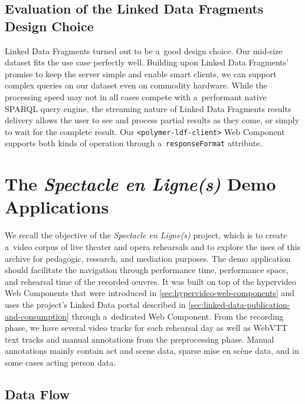 \documentclass[runningheads,a4paper]{llncs}
\begin{document}
\subsection{Evaluation of the Linked Data Fragments Design Choice}

Linked Data Fragments turned out to be a~good design choice.
Our mid-size dataset fits the use case perfectly well.
Building upon Linked Data Fragments' promise to keep the server simple
and enable smart clients, we can support complex queries on our dataset
even on commodity hardware.
While the processing speed may not in all cases compete with a~performant
native SPARQL query engine, the streaming nature of Linked Data Fragments
results delivery allows the user to see and process partial results as they come,
or simply to wait for the complete result.
Our \texttt{<polymer-ldf-client>} Web Component supports both kinds of operation
through a~\texttt{responseFormat} attribute.

\section{The \emph{Spectacle en Ligne(s)} Demo Applications}

We recall the objective of the \emph{Spectacle en Ligne(s)} project,
which  is to create a~video corpus of live theater and opera rehearsals
and to explore the uses of this archive for pedagogic, research, and mediation purposes.
The demo application should facilitate the navigation through performance time,
performance space, and rehearsal time of the recorded œuvres.
It was built on top of the hypervideo Web Components
that were introduced in \autoref{sec:hypervideo-web-components}
and uses the project's Linked Data portal described in
\autoref{sec:linked-data-publication-and-consumption} through a~dedicated Web Component.
From the recording phase, we have several video tracks for each rehearsal day
as well as WebVTT text tracks and manual annotations from the preprocessing phase.
Manual annotations mainly contain act and scene data, sparse mise en scène data,
and in some cases acting person data.

\subsection{Data Flow}
\end{document}
